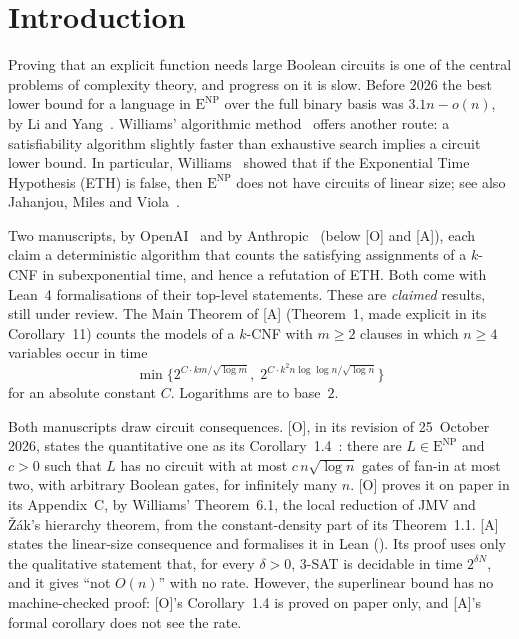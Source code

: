 \documentclass[10pt]{amsart}
\theoremstyle{plain}
\theoremstyle{definition}
\theoremstyle{remark}
\numberwithin{equation}{section}
\newcommand{\ENP}{\mathrm{E}^{\mathrm{NP}}}
\newcommand{\A}{\textup{[A]}}
\newcommand{\Oa}{\textup{[O]}}
\begin{document}
\maketitle

\section{Introduction}\label{sec:intro}

Proving that an explicit function needs large Boolean circuits is one of the central problems of
complexity theory, and progress on it is slow. Before 2026 the best lower bound for a language in
$\ENP$ over the full binary basis was $3.1n-o(n)$, by Li and Yang~\cite{LY22}. Williams'
algorithmic method~\cite{Wil13} offers another route: a satisfiability algorithm slightly faster
than exhaustive search implies a circuit lower bound. In particular, Williams~\cite[Theorem~6.1]{Wil13}
showed that if the Exponential Time Hypothesis (ETH) is false, then $\ENP$ does not have circuits
of linear size; see also Jahanjou, Miles and Viola~\cite[Corollary~2(1) with Corollary~3(1$'$)]{JMV15}.

Two manuscripts, by OpenAI~\cite{OpenAI26} and by Anthropic~\cite{Anthropic26} (below \Oa{} and
\A), each claim a deterministic algorithm that counts the satisfying assignments of a $k$-CNF in
subexponential time, and hence a refutation of ETH. Both come with Lean~4 formalisations of their
top-level statements. These are \emph{claimed} results, still under review. The Main Theorem of
\A{} (Theorem~1, made explicit in its Corollary~11) counts the models of a $k$-CNF with $m\ge2$
clauses in which $n\ge4$ variables occur in time
\[
  \min\bigl\{2^{C\cdot km/\sqrt{\log m}},\;2^{C\cdot k^2 n\log\log n/\sqrt{\log n}}\bigr\}
\]
for an absolute constant $C$. Logarithms are to base~$2$.

Both manuscripts draw circuit consequences. \Oa, in its revision of 25~October 2026, states the
quantitative one as its Corollary~1.4~\cite{OpenAI26}: there are $L\in\ENP$ and $c>0$
such that $L$ has no circuit with at most $c\,n\sqrt{\log n}$ gates of fan-in at most two, with
arbitrary Boolean gates, for infinitely many $n$. \Oa{} proves it on paper in its Appendix~C, by
Williams' Theorem~6.1, the local reduction of JMV and \v{Z}\'ak's hierarchy theorem, from the
constant-density part of its Theorem~1.1. \A{} states the linear-size consequence and formalises it
in Lean (). Its proof uses only the qualitative statement that, for every
$\delta>0$, $3$-SAT is decidable in time $2^{\delta N}$, and it gives ``not $O(n)$'' with no rate.
However, the superlinear bound has no machine-checked proof: \Oa's Corollary~1.4 is proved on paper
only, and \A's formal corollary does not see the rate.
\end{document}
